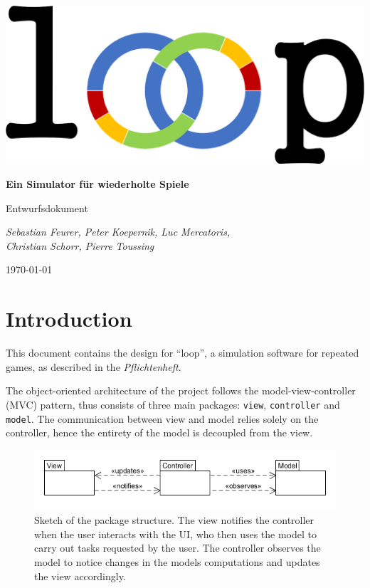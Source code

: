 \documentclass[parskip=full,11pt]{scrartcl}
\begin{document}
\begin{titlepage}
	\centering
	\vspace*{5cm}
	\includegraphics[width = 0.7\linewidth]{images/Logos/loop.png}\par
	{\huge\bfseries Ein Simulator für wiederholte Spiele\par}
	{\Large Entwurfsdokument\par}
	\vspace{2cm}
	{\Large\itshape Sebastian Feurer, Peter Koepernik, Luc Mercatoris,\\Christian Schorr, Pierre Toussing\par}
	\vfill
	{\large \today\par}
\end{titlepage}


\section{Introduction}
This document contains the design for \enquote{loop}, a simulation software for repeated games, as described in the \textit{Pflichtenheft}.

The object-oriented architecture of the project follows the model-view-controller (MVC) pattern, thus consists of three main packages: \texttt{view}, \texttt{controller} and \texttt{model}. The communication between view and model relies solely on the controller, hence the entirety of the model is decoupled from the view.

\begin{figure}[h]
	\centering
	\includegraphics[width=0.7\linewidth]{images/package_diagram_overview.png}
	\caption{Sketch of the package structure. The view notifies the controller when the user interacts with the UI, who then uses the model to carry out tasks requested by the user. The controller observes the model to notice changes in the models computations and updates the view accordingly.}
	\label{package_overview}
\end{figure}
\end{document}
